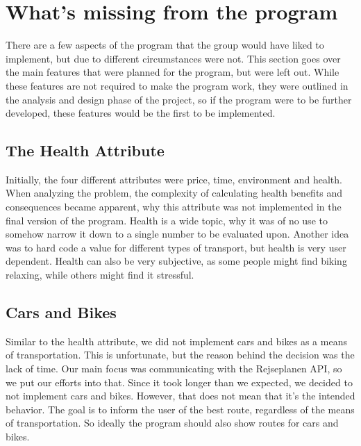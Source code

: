\section{What's missing from the program}\label{sec:improvements}

There are a few aspects of the program that the group would have liked to implement, but due to different circumstances
were not.
This section goes over the main features that were planned for the program, but were left out.
While these features are not required to make the program work, they were outlined in the analysis and design phase of
the project, so if the program were to be further developed, these features would be the first to be implemented.

\subsection{The Health Attribute}\label{subsec:health-attribute}

Initially, the four different attributes were price, time, environment and health.
When analyzing the problem, the complexity of calculating health benefits and consequences became apparent,
why this attribute was not implemented in the final version of the program.
Health is a wide topic, why it was of no use to somehow narrow it down to a single number to be evaluated upon.
Another idea was to hard code a value for different types of transport, but health is very user dependent.
Health can also be very subjective, as some people might find biking relaxing, while others might find it stressful.

\subsection{Cars and Bikes}\label{subsec:cars-bikes-walking}

Similar to the health attribute, we did not implement cars and bikes as a means of transportation.
This is unfortunate, but the reason behind the decision was the lack of time.
Our main focus was communicating with the Rejseplanen API, so we put our efforts into that.
Since it took longer than we expected, we decided to not implement cars and bikes.
However, that does not mean that it's the intended behavior.
The goal is to inform the user of the best route, regardless of the means of transportation.
So ideally the program should also show routes for cars and bikes.

